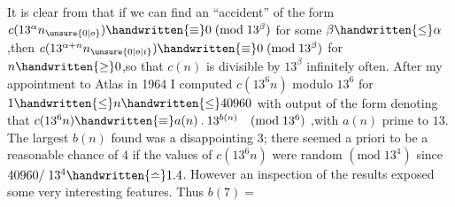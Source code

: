 It is clear from  that if we can find an ``accident'' of the form $c(13^{\alpha}n_{\unsure{0|o}})\handwritten{\equiv}0\;(\mathrm{mod}\;13^{\beta})$ for some $\beta\handwritten{\leq}\alpha$,then $c(13^{\alpha+n}n_{\unsure{0|o|i}})\handwritten{\equiv}0\;(\mathrm{mod}\;13^{\beta})$ for $n\handwritten{\geq}0$,so that \uline{$c(n)$} is divisible by $13^{\beta}$ infinitely often. After my appointment to Atlas in 1964 I computed \uline{$c(13^{6}n)$} modulo $13^{6}$ for $1\handwritten{\leq}n\handwritten{\leq}40960$ with output of the form
denoting that $c(13^{6}n)\handwritten{\equiv}a(n)\mathbin{.}13^{b(n)}\quad(\mathrm{mod}\;13^{6})$ ,with \uline{$a(n)$} prime to $13$. The largest $b(n)$ found was a disappointing $3$; there seemed a priori to be a reasonable chance of $4$ if the values of \uline{$c(13^{6}n)$} were random $(\mathrm{mod}\;13^{4})$ since $40960/\;13^{4}\handwritten{\bumpeq}1.4$. However an inspection of the results exposed some very interesting features. Thus $b(7)=$\ \parbox[c]{12mm}{}

